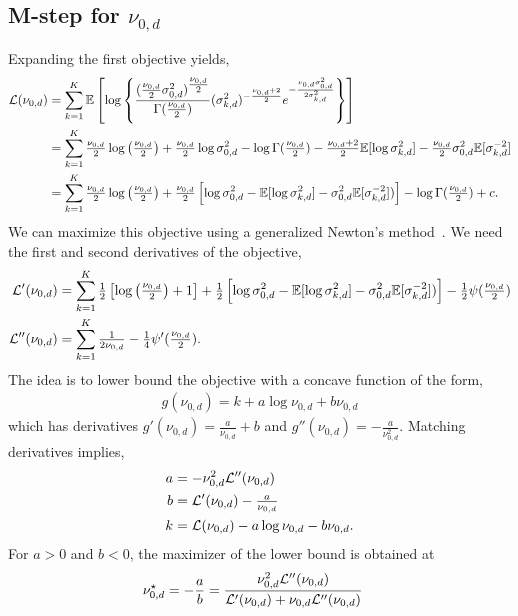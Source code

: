 \subsection{M-step for \texorpdfstring{$\nu_{0,d}$}{ν₀}}
Expanding the first objective yields,
\begin{align*}
    \mathcal{L}(\nu_{0,d})
    &= \sum_{k=1}^K \mathbb{E} \left[ \log \left\{ \frac{(\tfrac{\nu_{0,d}}{2} \sigma_{0,d}^2)^{\tfrac{\nu_{0,d}}{2}}}{\Gamma(\frac{\nu_{0,d}}{2}) } (\sigma_{k,d}^2)^{-\frac{\nu_{0,d} + 2}{2}} e^{-\frac{\nu_{0,d} \sigma_{0,d}^2}{2 \sigma_{k,d}^2}} \right\}  \right] \\
    &= \sum_{k=1}^K  \tfrac{\nu_{0,d}}{2} \log \left(\tfrac{\nu_{0,d}}{2}\right) + \tfrac{\nu_{0,d}}{2} \log \sigma_{0,d}^2 - \log \Gamma(\tfrac{\nu_{0,d}}{2}) -\tfrac{\nu_{0,d} + 2}{2} \mathbb{E}[\log \sigma_{k,d}^2] - \tfrac{\nu_{0,d}}{2} \sigma_{0,d}^2 \mathbb{E}[\sigma_{k,d}^{-2}] \\
    &= \sum_{k=1}^K  \tfrac{\nu_{0,d}}{2} \log \left(\tfrac{\nu_{0,d}}{2}\right) + \tfrac{\nu_{0,d}}{2} \left[\log \sigma_{0,d}^2 - \mathbb{E}[\log \sigma_{k,d}^2] - \sigma_{0,d}^2 \mathbb{E}[\sigma_{k,d}^{-2}]) \right] - \log \Gamma(\tfrac{\nu_{0,d}}{2}) + c.
\end{align*}
We can maximize this objective using a generalized Newton's method~\citep{minka2000beyond}.
We need the first and second derivatives of the objective,
\begin{align*}
    \mathcal{L}'(\nu_{0,d})
    &= \sum_{k=1}^K  \tfrac{1}{2} \left[ \log \left(\tfrac{\nu_{0,d}}{2}\right) + 1 \right] + \tfrac{1}{2} \left[\log \sigma_{0,d}^2 - \mathbb{E}[\log \sigma_{k,d}^2] - \sigma_{0,d}^2 \mathbb{E}[\sigma_{k,d}^{-2}]) \right] - \tfrac{1}{2} \psi(\tfrac{\nu_{0,d}}{2}) \\
    \mathcal{L}''(\nu_{0,d})
    &= \sum_{k=1}^K  \tfrac{1}{2 \nu_{0,d}} - \tfrac{1}{4} \psi'(\tfrac{\nu_{0,d}}{2}).
\end{align*}
The idea is to lower bound the objective with a concave function of the form,
\begin{align*}
    g(\nu_{0,d}) = k + a \log \nu_{0,d} + b \nu_{0,d}
\end{align*}
which has derivatives $g'(\nu_{0,d}) = \tfrac{a}{\nu_{0,d}} + b$ and $g''(\nu_{0,d}) = -\tfrac{a}{\nu_{0,d}^2}$. Matching derivatives implies,
\begin{align*}
    a &= -\nu_{0,d}^2 \mathcal{L}''(\nu_{0,d}) \\
    b &= \mathcal{L}'(\nu_{0,d}) - \tfrac{a}{\nu_{0,d}} \\
    k &= \mathcal{L}(\nu_{0,d}) - a\log \nu_{0,d} -b \nu_{0,d}.
\end{align*}
For $a > 0$ and $b<0$, the maximizer of the lower bound is obtained at
\begin{align}
    \nu_{0,d}^\star
    &= -\frac{a}{b} = \frac{\nu_{0,d}^2 \mathcal{L}''(\nu_{0,d})}{\mathcal{L}'(\nu_{0,d}) + \nu_{0,d} \mathcal{L}''(\nu_{0,d})}
\end{align}

